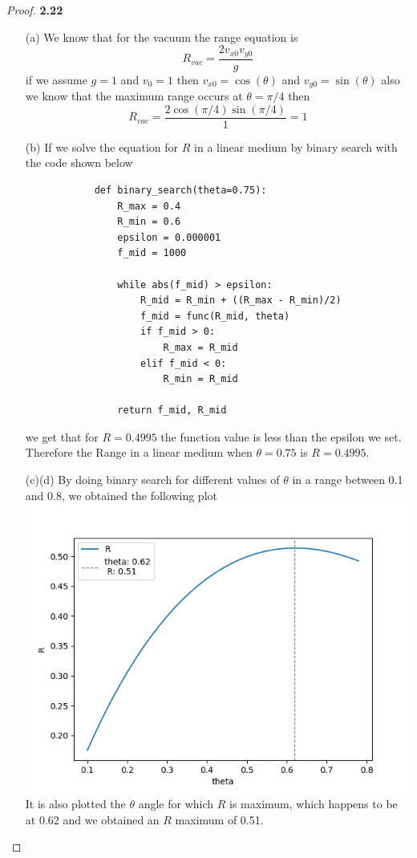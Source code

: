 \documentclass[11pt]{article}
\theoremstyle{definition}
\begin{document}
    \begin{proof}{\textbf{2.22}}
        \begin{itemize}
            \item [(a)] We know that for the vacuum the range equation is
            $$R_{vac} = \frac{2v_{x0}v_{y0}}{g}$$
            if we assume $g = 1$ and $v_0 = 1$ then $v_{x0} = \cos(\theta)$ and
            $v_{y0} = \sin(\theta)$ also we know that the maximum range occurs
            at $\theta = \pi / 4$ then
            $$R_{vac} = \frac{2\cos(\pi /4)\sin(\pi / 4)}{1} = 1$$
            \item [(b)] If we solve the equation for $R$ in a linear medium by
            binary search with the code shown below
            \begin{verbatim}
            def binary_search(theta=0.75):
                R_max = 0.4
                R_min = 0.6
                epsilon = 0.000001
                f_mid = 1000

                while abs(f_mid) > epsilon:
                    R_mid = R_min + ((R_max - R_min)/2)
                    f_mid = func(R_mid, theta)
                    if f_mid > 0:
                        R_max = R_mid
                    elif f_mid < 0:
                        R_min = R_mid

                return f_mid, R_mid
            \end{verbatim}
            we get that for $R = 0.4995$ the function value is less than
            the epsilon we set. Therefore the Range in a linear medium when
            $\theta = 0.75$ is $R = 0.4995$.
\cleardoublepage
            \item [(c)(d)] By doing binary search for different values of
            $\theta$ in a range between 0.1 and 0.8, we obtained the following
            plot\\
            \includegraphics{taylor-2.22.png}
            It is also plotted the $\theta$ angle for which $R$ is maximum,
            which happens to be at 0.62 and we obtained an $R$ maximum of 0.51.
        \end{itemize}
    \end{proof}
\end{document}
